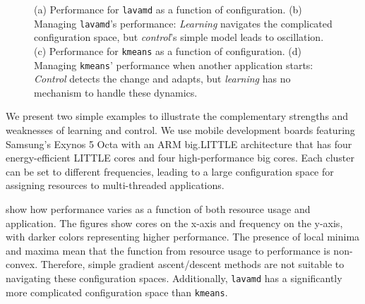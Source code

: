 \begin{figure}
  \subfloat[]
  {
    
    \label{fig:lavamd_timeline}
  }
  \subfloat[]
  {
    
    \label{fig:kmeans_timeline}    
  }
  \caption{(a) Performance for \texttt{lavamd} as a function of
    configuration. (b) Managing \texttt{lavamd}'s performance:
    \emph{Learning} navigates the complicated configuration space, but
    \emph{control}'s simple model leads to oscillation. (c)
    Performance for \texttt{kmeans} as a function of configuration.
    (d) Managing \texttt{kmeans}' performance when another application
    starts: \emph{Control} detects the change and adapts, but
    \emph{learning} has no mechanism to handle these dynamics.}
  \label{fig:learning-models}
\end{figure}



We present two simple examples to illustrate the complementary
strengths and weaknesses of learning and control.  We use mobile
development boards featuring Samsung's Exynos 5 Octa with an ARM
big.LITTLE architecture that has four energy-efficient LITTLE cores
and four high-performance big cores.  Each cluster can be set to
different frequencies, leading to a large configuration space for
assigning resources to multi-threaded applications.

 show how performance
varies as a function of both resource usage and application.  The
figures show cores on the x-axis and frequency on the y-axis, with
darker colors representing higher performance.  The presence of local
minima and maxima mean that the function from resource usage to
performance is non-convex.  Therefore, simple gradient ascent/descent
methods are not suitable to navigating these configuration spaces.
Additionally, \texttt{lavamd} has a significantly more complicated
configuration space than \texttt{kmeans}.

